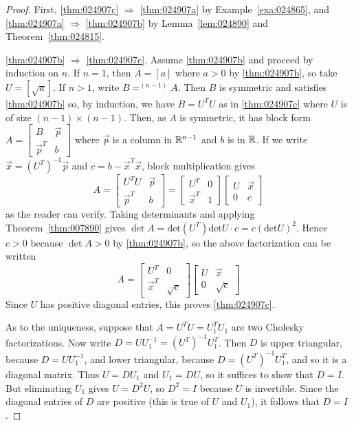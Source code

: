 \documentclass{ximera}
\begin{document}
\begin{proof}
First, \ref{thm:024907c} $\Rightarrow$ \ref{thm:024907a} by Example~\ref{exa:024865}, and \ref{thm:024907a} $\Rightarrow$ \ref{thm:024907b} by Lemma~\ref{lem:024890} and Theorem~\ref{thm:024815}.

\ref{thm:024907b} $\Rightarrow$ \ref{thm:024907c}. Assume \ref{thm:024907b} and proceed by induction on $n$. If $n = 1$, then $A = \left[ a \right]$ where $a > 0$ by \ref{thm:024907b}, so take $U = \left[ \sqrt{a} \right]$. If $n > 1$, write $B =^{(n-1)}A$. Then $B$ is symmetric and satisfies \ref{thm:024907b} so, by induction, we have $B = U^{T}U$ as in \ref{thm:024907c} where $U$ is of size $(n - 1) \times (n - 1)$. Then, as $A$ is symmetric, it has block form $A = \left[ \begin{array}{cc}
B & \vec{p} \\
\vec{p}^T & b
\end{array}\right]$ where $\vec{p}$ is a column in $\mathbb{R}^{n-1}$ and $b$ is in $\mathbb{R}$. If we write $\vec{x} = (U^{T})^{-1}\vec{p}$ and $c = b - \vec{x}^{T}\vec{x}$, block multiplication gives
\begin{equation*}
A = \left[ \begin{array}{cc}
U^TU & \vec{p} \\
\vec{p}^T & b
\end{array}\right] = \left[ \begin{array}{cc}
U^T & 0 \\
\vec{x}^T & 1
\end{array}\right] \left[ \begin{array}{cc}
U & \vec{x} \\
0 & c
\end{array}\right]
\end{equation*}
as the reader can verify. Taking determinants and applying Theorem~\ref{thm:007890} gives $\det A = \mbox{det}(U^{T}) \mbox{det} U \cdot c = c(\mbox{det}U)^{2}$. Hence $c > 0$ because $\det A > 0$ by \ref{thm:024907b}, so the above factorization can be written
\begin{equation*}
A = \left[ \begin{array}{cc}
U^T & 0 \\
\vec{x}^T & \sqrt{c}
\end{array}\right] \left[ \begin{array}{cc}
U & \vec{x} \\
0 & \sqrt{c}
\end{array}\right]
\end{equation*}
Since $U$ has positive diagonal entries, this proves \ref{thm:024907c}.

As to the uniqueness, suppose that $A = U^TU = U_{1}^TU_{1}$ are two Cholesky factorizations. Now write $D = UU_{1}^{-1} = (U^T)^{-1}U_{1}^T$. Then $D$ is upper triangular, because $D = UU_{1}^{-1}$, and lower triangular, because $D = (U^T)^{-1}U_{1}^T$, and so it is a diagonal matrix. Thus $U = DU_{1}$ and $U_{1} = DU$, so it suffices to show that $D = I$. But eliminating $U_{1}$ gives $U = D^{2}U$, so $D^{2} = I$ because $U$ is invertible. Since the diagonal entries of $D$ are positive (this is true of $U$ and $U_{1}$), it follows that $D = I$.
\end{proof}
\end{document}
